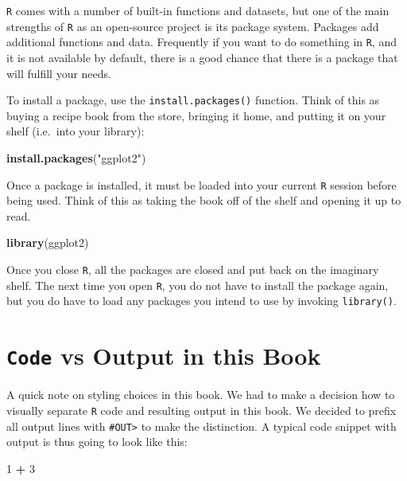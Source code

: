 \documentclass[]{book}
\newenvironment{Shaded}{\begin{snugshade}}{\end{snugshade}}
\newcommand{\DecValTok}[1]{\textcolor[rgb]{0.00,0.00,0.81}{#1}}
\newcommand{\KeywordTok}[1]{\textcolor[rgb]{0.13,0.29,0.53}{\textbf{#1}}}
\newcommand{\NormalTok}[1]{#1}
\newcommand{\OperatorTok}[1]{\textcolor[rgb]{0.81,0.36,0.00}{\textbf{#1}}}
\newcommand{\StringTok}[1]{\textcolor[rgb]{0.31,0.60,0.02}{#1}}
\begin{document}
\texttt{R} comes with a number of built-in functions and datasets, but one of the main strengths of \texttt{R} as an open-source project is its package system. Packages add additional functions and data. Frequently if you want to do something in \texttt{R}, and it is not available by default, there is a good chance that there is a package that will fulfill your needs.

To install a package, use the \texttt{install.packages()} function. Think of this as buying a recipe book from the store, bringing it home, and putting it on your shelf (i.e.~into your library):

\begin{Shaded}
\begin{Highlighting}[]
\KeywordTok{install.packages}\NormalTok{(}\StringTok{"ggplot2"}\NormalTok{)}
\end{Highlighting}
\end{Shaded}

Once a package is installed, it must be loaded into your current \texttt{R} session before being used. Think of this as taking the book off of the shelf and opening it up to read.

\begin{Shaded}
\begin{Highlighting}[]
\KeywordTok{library}\NormalTok{(ggplot2)}
\end{Highlighting}
\end{Shaded}

Once you close \texttt{R}, all the packages are closed and put back on the imaginary shelf. The next time you open \texttt{R}, you do not have to install the package again, but you do have to load any packages you intend to use by invoking \texttt{library()}.

\hypertarget{code-output}{%
\section{\texorpdfstring{\texttt{Code} vs Output in this Book}{Code vs Output in this Book}}\label{code-output}}

A quick note on styling choices in this book. We had to make a decision how to visually separate \texttt{R} code and resulting output in this book. We decided to prefix all output lines with \texttt{\#OUT\textgreater{}} to make the distinction. A typical code snippet with output is thus going to look like this:

\begin{Shaded}
\begin{Highlighting}[]
\DecValTok{1} \OperatorTok{+}\StringTok{ }\DecValTok{3}
\end{Highlighting}
\end{Shaded}
\end{document}
